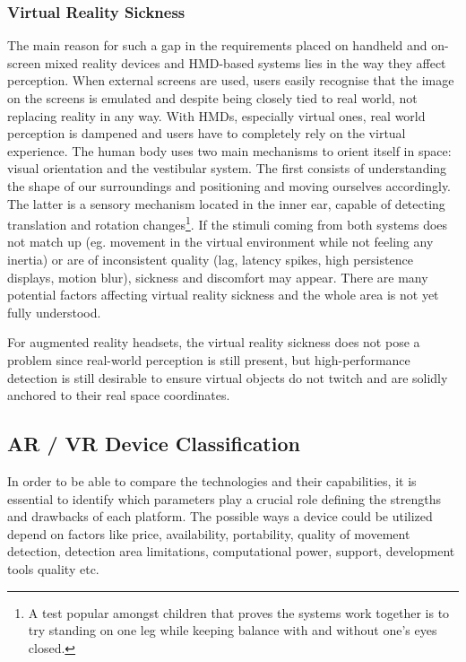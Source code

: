 \documentclass[12pt, a4paper]{article}
\begin{document}
\subsubsection{Virtual Reality Sickness} 
The main reason for such a gap in the requirements placed on handheld and on-screen mixed reality devices and HMD-based systems lies in the way they affect perception. When external screens are used, users easily recognise that the image on the screens is emulated and despite being closely tied to real world, not replacing reality in any way. With HMDs, especially virtual ones, real world perception is dampened and users have to completely rely on the virtual experience. The human body uses two main mechanisms to orient itself in space: visual orientation and the vestibular system. The first consists of understanding the shape of our surroundings and positioning and moving ourselves accordingly. The latter is a sensory mechanism located in the inner ear, capable of detecting translation and rotation changes\footnote{A test popular amongst children that proves the systems work together is to try standing on one leg while keeping balance with and without one's eyes closed.}. If the stimuli coming from both systems does not match up (eg. movement in the virtual environment while not feeling any inertia) or are of inconsistent quality (lag, latency spikes, high persistence displays, motion blur), sickness and discomfort may appear. There are many potential factors affecting virtual reality sickness and the whole area is not yet fully understood.

For augmented reality headsets, the virtual reality sickness does not pose a problem since real-world perception is still present, but high-performance detection is still desirable to ensure virtual objects do not twitch and are solidly anchored to their real space coordinates.

\subsection{AR / VR Device Classification}
In order to be able to compare the technologies and their capabilities, it is essential to identify which parameters play a crucial role defining the strengths and drawbacks of each platform. The possible ways a device could be utilized depend on factors like price, availability, portability, quality of movement detection, detection area limitations, computational power, support, development tools quality etc.
\end{document}
